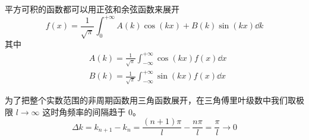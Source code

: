 
\begin{issues}
\issueDraft
\end{issues}

平方可积的函数都可以用正弦和余弦函数来展开
\begin{equation}
f(x) = \frac{1}{\sqrt{\pi}}\int_0^{+\infty} A(k) \cos(kx) + B(k)\sin(kx) \dd{k}
\end{equation}
其中
\begin{equation}
\begin{aligned}
&A(k) = \frac{1}{\sqrt{\pi}}\int_{-\infty}^{+\infty} \cos(kx) f(x) \dd{x}\\
&B(k) = \frac{1}{\sqrt{\pi}}\int_{-\infty}^{+\infty} \sin(kx) f(x) \dd{x}
\end{aligned}
\end{equation}

为了把整个实数范围的非周期函数用三角函数展开，在三角傅里叶级数中我们取极限 $l\to\infty$ 这时角频率的间隔趋于 0。
\begin{equation}
\Delta k = k_{n+1} - k_n = \frac{(n+1)\pi}{l} - \frac{n\pi}{l} = \frac{\pi}{l} \to 0
\end{equation}
